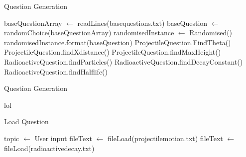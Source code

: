 \begin{algorithm}[h]\label{questiongeneration}
	\caption{Question Generation}
	\begin{algorithmic}[1]
		\State baseQuestionArray $\gets$ readLines(basequestions.txt)
		\State baseQuestion \(\gets\) randomChoice(baseQuestionArray)
		\State randomisedInstance $\gets$ Randomised()
		\State randomisedInstance.format(baseQuestion)
		\State ProjectileQuestion.FindTheta()
		\EndIf
		\State ProjectileQuestion.findXdistance()
		\EndIf
		\State ProjectileQuestion.findMaxHeight()
		\EndIf
		\State RadioactiveQuestion.findParticles()
		\EndIf
		\State RadioactiveQuestion.findDecayConstant()
		\EndIf
		\State RadioactiveQuestion.findHalflife()
		\EndIf
	\end{algorithmic}
\end{algorithm}
\begin{algorithm}[h]\label{}
	\caption{Question Generation}
	\begin{algorithmic}[1]
		\State lol
	\end{algorithmic}
\end{algorithm}
\fi
\begin{algorithm}[h]
	\caption{Load Question}
	\begin{algorithmic}
		\State topic $\gets$ User input
			\State fileText $\gets$ fileLoad(projectilemotion.txt)
		\EndIf
			\State fileText $\gets$ fileLoad(radioactivedecay.txt)
		\EndIf
			
	\end{algorithmic}
\end{algorithm}